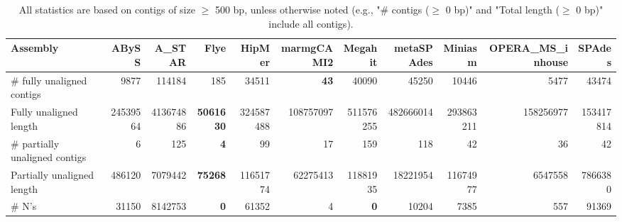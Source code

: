 \documentclass[12pt,a4paper]{article}
\begin{document}
\begin{table}[ht]
\begin{center}
\caption{All statistics are based on contigs of size $\geq$ 500 bp, unless otherwise noted (e.g., "\# contigs ($\geq$ 0 bp)" and "Total length ($\geq$ 0 bp)" include all contigs).}
\begin{tabular}{|l*{10}{|r}|}
\hline
Assembly & ABySS & A\_STAR & Flye & HipMer & marmgCAMI2 & Megahit & metaSPAdes & Miniasm & OPERA\_MS\_inhouse & SPAdes \\ \hline
\# fully unaligned contigs & 9877 & 114184 & 185 & 34511 & {\bf 43} & 40090 & 45250 & 10446 & 5477 & 43474 \\ \hline
Fully unaligned length & 24539564 & 413674886 & {\bf 5061630} & 324587488 & 108757097 & 511576255 & 482666014 & 293863211 & 158256977 & 153417814 \\ \hline
\# partially unaligned contigs & 6 & 125 & {\bf 4} & 99 & 17 & 159 & 118 & 42 & 36 & 42 \\ \hline
Partially unaligned length & 486120 & 7079442 & {\bf 75268} & 11651774 & 62275413 & 11881935 & 18221954 & 11674977 & 6547558 & 7866380 \\ \hline
\# N's & 31150 & 8142753 & {\bf 0} & 61352 & 4 & {\bf 0} & 10204 & 7385 & 557 & 91369 \\ \hline
\end{tabular}
\end{center}
\end{table}
\end{document}
